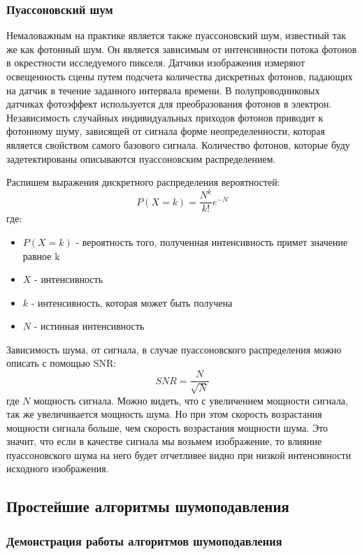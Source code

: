 \subsubsection{Пуассоновский шум}
Немаловажным на практике является также пуассоновский шум, известный так же как фотонный шум. Он является зависимым от интенсивности потока фотонов в окрестности исследуемого пикселя.
Датчики изображения измеряют освещенность сцены путем подсчета количества дискретных фотонов, падающих на датчик в течение заданного интервала времени. В полупроводниковых датчиках фотоэффект используется для преобразования фотонов в электрон. Независимость случайных индивидуальных приходов фотонов приводит к фотонному шуму, зависящей от сигнала форме неопределенности, которая является свойством самого базового сигнала\cite{poisson}.
Количество фотонов, которые буду задетектированы описываются пуассоновским распределением.

Распишем выражения дискретного распределения вероятностей:
\begin{equation}
	P(X=k)=\frac{N^k}{k!}e^{-N}
\end{equation}
где:
\begin{itemize}
	\item $P(X=k)$ - вероятность того, полученная интенсивность примет значение равное k
	\item $X$ - интенсивность
	\item $k$ - интенсивность, которая может быть получена
	\item $N$ - истинная интенсивность
\end{itemize}

Зависимость шума, от сигнала, в случае пуассоновского распределения можно описать с помощью SNR\cite{Kumar}:
\begin{equation}
	SNR=\frac{N}{\sqrt{N}}
\end{equation}
где $N$ мощность сигнала. Можно видеть, что с увеличением мощности сигнала, так же увеличивается мощность шума. Но при этом скорость возрастания мощности сигнала больше, чем скорость возрастания мощности шума. Это значит, что если в качестве сигнала мы возьмем изображение, то влияние пуассоновского шума на него будет отчетливее видно при низкой интенсивности исходного изображения.
\subsection{Простейшие алгоритмы шумоподавления}
\subsubsection{Демонстрация работы алгоритмов шумоподавления}
